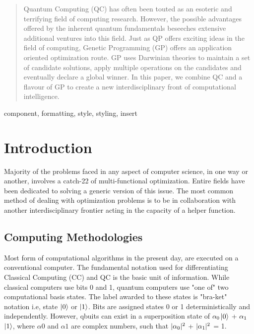 \documentclass[conference]{IEEEtran}
\begin{document}
\begin{abstract}
Quantum Computing (QC) has often been touted as an esoteric and terrifying field of computing research. However, the possible advantages offered by the inherent quantum fundamentals beseeches extensive additional ventures into this field. Just as QP offers exciting ideas in the field of computing, Genetic Programming (GP) offers an application oriented optimization route. GP uses Darwinian theories to maintain a set of candidate solutions, apply multiple operations on the candidates and eventually declare a global winner. In this paper, we combine QC and a flavour of GP to create a new interdisciplinary front of computational intelligence. 
\end{abstract}

\begin{IEEEkeywords}
component, formatting, style, styling, insert
\end{IEEEkeywords}

\section{Introduction}

Majority of the problems faced in any aspect of computer science, in one way or another, involves a catch-22 of multi-functional optimization. Entire fields have been dedicated to solving a generic version of this issue. The most common method of dealing with optimization problems is to be in collaboration with another interdisciplinary frontier acting in the capacity of a helper function. 


\subsection{Computing Methodologies}

Most form of computational algorithms in the present day, are executed on a conventional computer. The fundamental notation used for differentiating Classical Computing (CC) and QC \cite{nara} is the basic unit of information. While classical computers use bits 0 and 1, quantum computers use "one of" two computational basis states. The label awarded to these states is "bra-ket" notation i.e, state $\ket{0}$ or $\ket{1}$. Bits are assigned states 0 or 1 deterministically and independently. However, qbuits can exist in a superposition state of $\alpha\textsubscript{0}$$\ket{0}$ + $\alpha\textsubscript{1}$$\ket{1}$, where $\alpha{0}$ and $\alpha{1}$ are complex numbers, such that $|\alpha\textsubscript{0}|\textsuperscript{2}$ + $|\alpha\textsubscript{1}|\textsuperscript{2}$ = 1.
\end{document}
